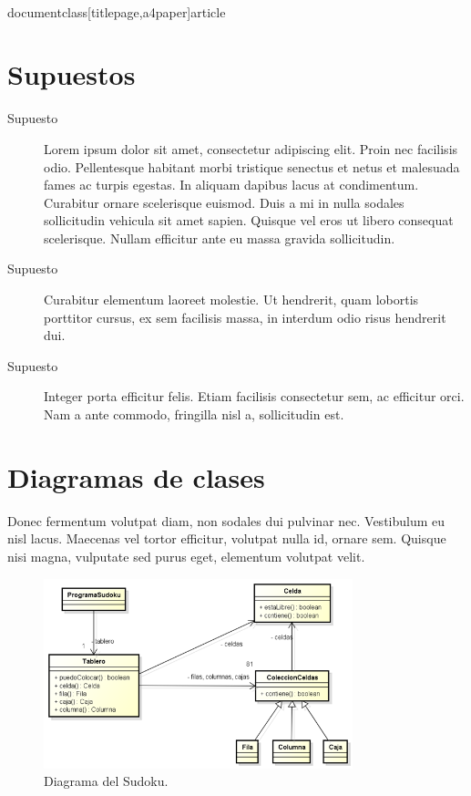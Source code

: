 \\documentclass[titlepage,a4paper]{article}
\begin{document}
\section{Supuestos}\label{sec:supuestos}

\begin{description}
    

\item[Supuesto] Lorem ipsum dolor sit amet, consectetur adipiscing elit. Proin nec facilisis odio. Pellentesque habitant morbi tristique senectus et netus et malesuada fames ac turpis egestas. In aliquam dapibus lacus at condimentum. Curabitur ornare scelerisque euismod. Duis a mi in nulla sodales sollicitudin vehicula sit amet sapien. Quisque vel eros ut libero consequat scelerisque. Nullam efficitur ante eu massa gravida sollicitudin.
\item[Supuesto] Curabitur elementum laoreet molestie. Ut hendrerit, quam lobortis porttitor cursus, ex sem facilisis massa, in interdum odio risus hendrerit dui.
\item[Supuesto] Integer porta efficitur felis. Etiam facilisis consectetur sem, ac efficitur orci. Nam a ante commodo, fringilla nisl a, sollicitudin est.

\end{description}

\section{Diagramas de clases}\label{sec:modelo}

Donec fermentum volutpat diam, non sodales dui pulvinar nec. Vestibulum eu nisl lacus. Maecenas vel tortor efficitur, volutpat nulla id, ornare sem. Quisque nisi magna, vulputate sed purus eget, elementum volutpat velit.

\begin{figure}[H]
\centering
\includegraphics[width=0.8\textwidth]{ClasesDiagramas/diagrama_clase01.png}
\caption{\label{fig:class01}Diagrama del Sudoku.}
\end{figure}
\end{document}
